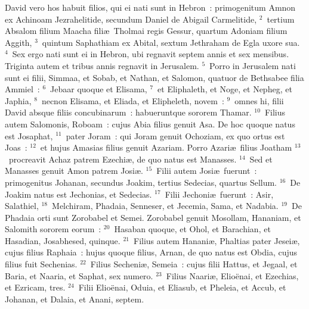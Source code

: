 \lettrine[lines=3,image=true,loversize=0.05,lraise=-0.03]{D}{}avid vero hos habuit filios, qui ei nati sunt in Hebron~: primogenitum Amnon ex Achinoam Jezrahelitide, secundum Daniel de Abigail Carmelitide,
${}^{2}$~tertium Absalom filium Maacha fili\ae\ Tholmai regis Gessur, quartum Adoniam filium Aggith,
${}^{3}$~quintum Saphathiam ex Abital, sextum Jethraham de Egla uxore sua.
${}^{4}$~Sex ergo nati sunt ei in Hebron, ubi regnavit septem annis et sex mensibus. Triginta autem et tribus annis regnavit in Jerusalem.
${}^{5}$~Porro in Jerusalem nati sunt ei filii, Simmaa, et Sobab, et Nathan, et Salomon, quatuor de Bethsabee filia Ammiel~:
${}^{6}$~Jebaar quoque et Elisama,
${}^{7}$~et Eliphaleth, et Noge, et Nepheg, et Japhia,
${}^{8}$~necnon Elisama, et Eliada, et Elipheleth, novem~:
${}^{9}$~omnes hi, filii David absque filiis concubinarum~: habueruntque sororem Thamar.
${}^{10}$~Filius autem Salomonis, Roboam~: cujus Abia filius genuit Asa. De hoc quoque natus est Josaphat,
${}^{11}$~pater Joram~: qui Joram genuit Ochoziam, ex quo ortus est Joas~:
${}^{12}$~et hujus Amasias filius genuit Azariam. Porro Azari\ae\ filius Joatham
${}^{13}$~procreavit Achaz patrem Ezechi\ae , de quo natus est Manasses.
${}^{14}$~Sed et Manasses genuit Amon patrem Josi\ae .
${}^{15}$~Filii autem Josi\ae\ fuerunt~: primogenitus Johanan, secundus Joakim, tertius Sedecias, quartus Sellum.
${}^{16}$~De Joakim natus est Jechonias, et Sedecias.
${}^{17}$~Filii Jechoni\ae\ fuerunt~: Asir, Salathiel,
${}^{18}$~Melchiram, Phadaia, Senneser, et Jecemia, Sama, et Nadabia.
${}^{19}$~De Phadaia orti sunt Zorobabel et Semei. Zorobabel genuit Mosollam, Hananiam, et Salomith sororem eorum~:
${}^{20}$~Hasaban quoque, et Ohol, et Barachian, et Hasadian, Josabhesed, quinque.
${}^{21}$~Filius autem Hanani\ae , Phaltias pater Jesei\ae , cujus filius Raphaia~: hujus quoque filius, Arnan, de quo natus est Obdia, cujus filius fuit Sechenias.
${}^{22}$~Filius Secheni\ae , Semeia~: cujus filii Hattus, et Jegaal, et Baria, et Naaria, et Saphat, sex numero.
${}^{23}$~Filius Naari\ae , Elio\"enai, et Ezechias, et Ezricam, tres.
${}^{24}$~Filii Elio\"enai, Oduia, et Eliasub, et Pheleia, et Accub, et Johanan, et Dalaia, et Anani, septem.

